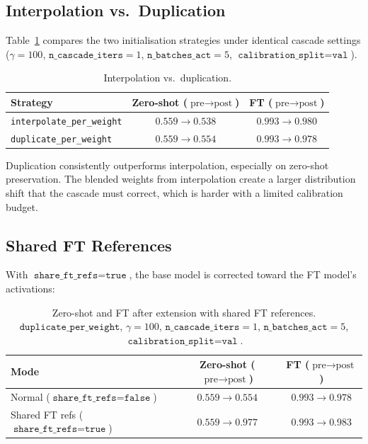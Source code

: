 \documentclass[11pt,a4paper]{article}
\begin{document}
\subsection{Interpolation vs.\ Duplication}
\label{subsec:interp_vs_dupl_results}

Table~\ref{tab:strat_compare} compares the two initialisation strategies
under identical cascade settings ($\gamma=100$, $\texttt{n\_cascade\_iters}=1$,
$\texttt{n\_batches\_act}=5$, $\texttt{calibration\_split}=\texttt{val}$).

\begin{table}[ht]
\centering
\caption{Interpolation vs.\ duplication.}
\label{tab:strat_compare}
\begin{tabular}{lcc}
\toprule
Strategy & Zero-shot ($\text{pre}\to\text{post}$) & FT ($\text{pre}\to\text{post}$) \\
\midrule
\texttt{interpolate\_per\_weight} & $0.559 \to 0.538$ & $0.993 \to 0.980$ \\
\texttt{duplicate\_per\_weight}   & $0.559 \to \mathbf{0.554}$ & $0.993 \to 0.978$ \\
\bottomrule
\end{tabular}
\end{table}

Duplication consistently outperforms interpolation, especially on zero-shot
preservation. The blended weights from interpolation create a larger
distribution shift that the cascade must correct, which is harder with a
limited calibration budget.

\subsection{Shared FT References}
\label{subsec:share_ft_results}

With $\texttt{share\_ft\_refs}=\texttt{true}$, the base model is corrected
toward the FT model's activations:

\begin{table}[ht]
\centering
\caption{Zero-shot and FT after extension with shared FT references.
$\texttt{duplicate\_per\_weight}$, $\gamma=100$, $\texttt{n\_cascade\_iters}=1$,
$\texttt{n\_batches\_act}=5$, $\texttt{calibration\_split}=\texttt{val}$.}
\label{tab:share_ft}
\begin{tabular}{lcc}
\toprule
Mode & Zero-shot ($\text{pre}\to\text{post}$) & FT ($\text{pre}\to\text{post}$) \\
\midrule
Normal ($\texttt{share\_ft\_refs}=\texttt{false}$) & $0.559 \to 0.554$ & $0.993 \to 0.978$ \\
Shared FT refs ($\texttt{share\_ft\_refs}=\texttt{true}$) & $0.559 \to \mathbf{0.977}$ & $0.993 \to 0.983$ \\
\bottomrule
\end{tabular}
\end{table}
\end{document}
